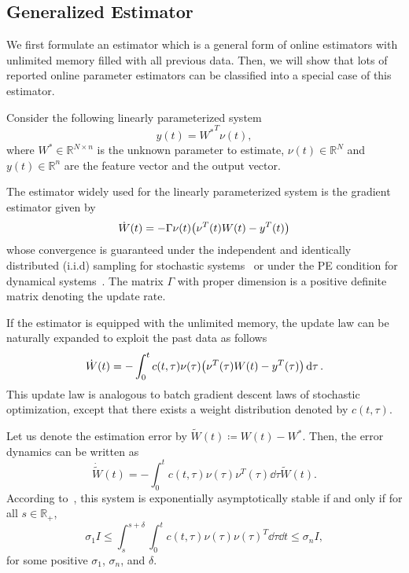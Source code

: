 \documentclass[]{IEEEtran}
\theoremstyle{definition}
\theoremstyle{remark}
\newcommand{\MB}[1]{\mathbb{#1}}
\begin{document}
\subsection{Generalized Estimator}
We first formulate an estimator which is a general form of online estimators
with unlimited memory filled with all previous data. Then, we will show that
lots of reported online parameter estimators can be classified into a special
case of this estimator.

Consider the following linearly parameterized system
\begin{equation*}
	y(t) = {W^\ast}^T \nu(t),
\end{equation*}
where $W^\ast \in \MB{R}^{N \times n}$ is the unknown parameter to estimate,
$\nu(t) \in \MB{R}^N$ and $y(t) \in \MB{R}^n$ are the feature vector and the
output vector.

The estimator widely used for the linearly parameterized system is the gradient
estimator given by
\begin{equation}\label{eq:estimation_system}
	\dot{W}(t) =  - \Gamma \nu(t) \qty(\nu^T(t) W(t) - y^T(t))
\end{equation}
whose convergence is guaranteed under the independent and identically
distributed (i.i.d) sampling for stochastic
systems~\cite{nemirovski_robust_2009} or under the PE condition for dynamical
systems~\cite{slotine_applied_1991}. The matrix $\Gamma$ with proper dimension
is a positive definite matrix denoting the update rate.

If the estimator is equipped with the unlimited memory, the update law can be
naturally expanded to exploit the past data as follows
\begin{equation}\label{eq:estimation_system_memory}
	\dot{W}(t) = - \int_0^t c(t, \tau) \nu(\tau) \qty(\nu^T(\tau) W(t) -
	y^T(\tau)) \dd{\tau}.
\end{equation}
This update law is analogous to batch gradient descent laws of stochastic
optimization, except that there exists a weight distribution denoted by $c(t,
\tau)$.

Let us denote the estimation error by $\tilde{W}(t) \coloneqq W(t) - W^\ast$.
Then, the error dynamics can be written as
\begin{equation}\label{eq:estimation_error_system_memory}
	\dot{\tilde{W}}(t) = - \int_0^t c(t, \tau) \nu(\tau) \nu^T(\tau) \dd{\tau}
	\tilde{W}(t).
\end{equation}
According to~\cite{anderson_exponential_1977}, this system is exponentially
asymptotically stable if and only if for all $s
\in \MB{R}_{+}$,
\begin{equation}
	\sigma_1 I \le \int_{s}^{s+\delta} \int_0^t c(t, \tau) \nu(\tau) \nu(\tau)^T
	\dd{\tau} \dd{t}
	\le \sigma_n I,
\end{equation}
for some positive $\sigma_1$, $\sigma_n$, and $\delta$.
\end{document}
